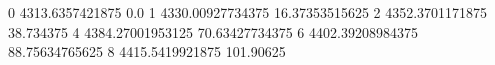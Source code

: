 0 4313.6357421875 0.0
1 4330.00927734375 16.37353515625
2 4352.3701171875 38.734375
4 4384.27001953125 70.63427734375
6 4402.39208984375 88.75634765625
8 4415.5419921875 101.90625
